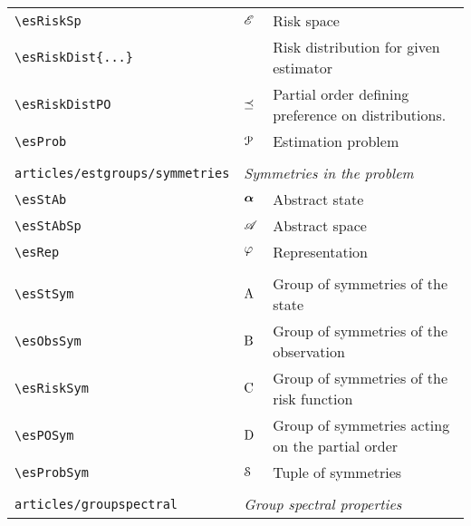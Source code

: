 \begin{longtable}{lll}
 {\color[rgb]{0.5,0.5,0.5}\texttt{\textbackslash esRiskSp}} & $\mathscr{E}$ &  Risk space\\ 
 {\color[rgb]{0.5,0.5,0.5}\texttt{\textbackslash esRiskDist\{...\}}} &  &  Risk distribution for given estimator\\ 
 {\color[rgb]{0.5,0.5,0.5}\texttt{\textbackslash esRiskDistPO}} & $\preceq$ &  Partial order defining preference on distributions.\\ 
 {\color[rgb]{0.5,0.5,0.5}\texttt{\textbackslash esProb}} & $\mathcal{P}$ &  Estimation problem\\ 
  &  & \\ 
 {\color[rgb]{0.5,0.5,0.5}\texttt{articles/estgroups/symmetries}} & \multicolumn{2}{l}{\emph{Symmetries in the problem}}\\ 
 \hline
{\color[rgb]{0.5,0.5,0.5}\texttt{\textbackslash esStAb}} & $\boldsymbol{\alpha}$ &  Abstract state\\ 
 {\color[rgb]{0.5,0.5,0.5}\texttt{\textbackslash esStAbSp}} & $\mathscr{A}$ &  Abstract space\\ 
 {\color[rgb]{0.5,0.5,0.5}\texttt{\textbackslash esRep}} & $\varphi$ &  Representation\\ 
  &  & {\setlength\fboxsep{1pt}%
\fbox{%
\color[rgb]{0.5,0.5,0.5}\begin{minipage}[]{8cm}%
$\esRep: \esSt \mapsto \esStAb$.\par%
{\small{\texttt{\$\textbackslash esRep: \textbackslash esSt \textbackslash mapsto \textbackslash esStAb\$.}}}\end{minipage}%
}%
}%
\\ 
 {\color[rgb]{0.5,0.5,0.5}\texttt{\textbackslash esStSym}} & $\mathrm{A}$ &  Group of symmetries of the state\\ 
 {\color[rgb]{0.5,0.5,0.5}\texttt{\textbackslash esObsSym}} & $\mathrm{B}$ &  Group of symmetries of the observation\\ 
 {\color[rgb]{0.5,0.5,0.5}\texttt{\textbackslash esRiskSym}} & $\mathrm{C}$ &  Group of symmetries of the risk function\\ 
 {\color[rgb]{0.5,0.5,0.5}\texttt{\textbackslash esPOSym}} & $\mathrm{D}$ &  Group of symmetries acting on the partial order\\ 
 {\color[rgb]{0.5,0.5,0.5}\texttt{\textbackslash esProbSym}} & $\mathcal{S}$ &  Tuple of symmetries\\ 
  &  & \\ 
 {\color[rgb]{0.5,0.5,0.5}\texttt{articles/groupspectral}} & \multicolumn{2}{l}{\emph{Group spectral properties}}\\ 

\end{longtable}
